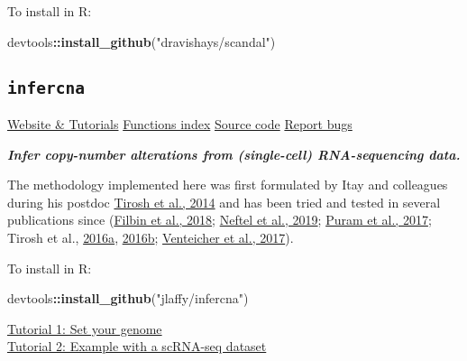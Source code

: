 \documentclass[]{book}
\newenvironment{Shaded}{\begin{snugshade}}{\end{snugshade}}
\newcommand{\KeywordTok}[1]{\textcolor[rgb]{0.13,0.29,0.53}{\textbf{#1}}}
\newcommand{\StringTok}[1]{\textcolor[rgb]{0.31,0.60,0.02}{#1}}
\newcommand{\OperatorTok}[1]{\textcolor[rgb]{0.81,0.36,0.00}{\textbf{#1}}}
\newcommand{\NormalTok}[1]{#1}
\begin{document}
To install in R:

\begin{Shaded}
\begin{Highlighting}[]
\NormalTok{devtools}\OperatorTok{::}\KeywordTok{install_github}\NormalTok{(}\StringTok{"dravishays/scandal"}\NormalTok{)}
\end{Highlighting}
\end{Shaded}

\subsection{\texorpdfstring{\texttt{infercna}}{infercna}}\label{infercna}

\href{https://jlaffy.github.io/infercna}{Website \& Tutorials}
\textbar{}
\href{https://jlaffy.github.io/infercna/reference/index.html}{Functions
index} \textbar{} \href{https://github.com/jlaffy/infercna}{Source code}
\textbar{} \href{https://github.com/jlaffy/infercna/issues}{Report bugs}

\emph{\textbf{Infer copy-number alterations from (single-cell)
RNA-sequencing data.}}

The methodology implemented here was first formulated by Itay and
colleagues during his postdoc
\href{https://science.sciencemag.org/content/344/6190/1396.long}{Tirosh
et al., 2014} and has been tried and tested in several publications
since
(\href{https://science.sciencemag.org/content/360/6386/331.long}{Filbin
et al., 2018};
\href{https://www.ncbi.nlm.nih.gov/pubmed/31327527}{Neftel et al.,
2019}; \href{https://www.ncbi.nlm.nih.gov/pubmed/29198524}{Puram et al.,
2017}; Tirosh et al.,
\href{https://science.sciencemag.org/content/352/6282/189.long}{2016a},
\href{https://www.nature.com/articles/nature20123}{2016b};
\href{https://science.sciencemag.org/content/355/6332/eaai8478.long}{Venteicher
et al., 2017}).

To install in R:

\begin{Shaded}
\begin{Highlighting}[]
\NormalTok{devtools}\OperatorTok{::}\KeywordTok{install_github}\NormalTok{(}\StringTok{"jlaffy/infercna"}\NormalTok{)}
\end{Highlighting}
\end{Shaded}

\href{https://jlaffy.github.io/infercna/articles/useGenome.html}{Tutorial
1: Set your genome}\\
\href{https://jlaffy.github.io/infercna/articles/infercna_tutorial.html}{Tutorial
2: Example with a scRNA-seq dataset}
\end{document}

